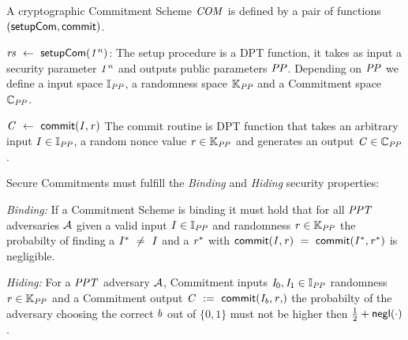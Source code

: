 \begin{definition}\label{def:pre:commitment}
    A cryptographic Commitment Scheme $\mathit{COM}$ is defined by a pair of functions $(\mathsf{setupCom}, \mathsf{commit})$.
    \begin{asparaitem}
        \item $\mathit{rs} ~\leftarrow~ \mathsf{setupCom} (\mathit{1^n})$: The setup procedure is a DPT function, it takes as input a security parameter $\mathit{1^n}$ and outputs public parameters $\mathit{PP}$.
        Depending on $\mathit{PP}$ we define a input space $\mathbb{I}_{\mathit{PP}}$, a randomness space $\mathbb{K}_{\mathit{PP}}$ and a Commitment space $\mathbb{C}_{\mathit{PP}}$.
        \item $\mathit{C} ~\leftarrow~ \mathsf{commit}(\mathit{I}, \mathit{r})$ The commit routine is DPT function that takes an arbitrary input $\mathit{I} \in \mathbb{I}_{\mathit{PP}}$, a random nonce value $\mathit{r} \in \mathbb{K}_{\mathit{PP}}$ and
        generates an output $\mathit{C} \in \mathbb{C}_{\mathit{PP}}$.
    \end{asparaitem}

    Secure Commitments must fulfill the \emph{Binding} and \emph{Hiding} security properties:
    \begin{asparaitem}
        \item \textit{Binding:} If a Commitment Scheme is binding it must hold that for all $\mathit{PPT}$ adversaries $\mathcal{A}$ given a valid input $\mathit{I} \in \mathbb{I}_{\mathit{PP}}$
        and randomness $\mathit{r} \in \mathbb{K}_{\mathit{PP}}$ the probabilty of finding a $\mathit{I}^* ~\neq~ \mathit{I}$ and a $\mathit{r}^*$ with
        $\mathsf{commit}(\mathit{I}, \mathit{r}) ~=~ \mathsf{commit}(\mathit{I}^*, \mathit{r}^*)$ is negligible.
        \item \textit{Hiding:} For a $\mathit{PPT}$ adversary $\mathcal{A}$, Commitment inputs $\mathit{I}_0, \mathit{I}_1 \in \mathbb{I}_{\mathit{PP}}$ randomness $\mathit{r} \in
       \mathbb{K}_{\mathit{PP}}$ and a Commitment output $\varCommitment \opAssign \procCommit{\varInput_{\varB}, \varNonceAlt}$ the probabilty of the adversary choosing the correct $\mathit{b}$ out of $\{0,1\}$
        must not be higher then $\frac{1}{2} + \mathsf{negl}(\cdot)$.
    \end{asparaitem}
\end{definition}

